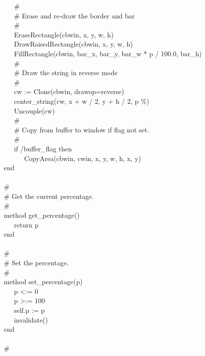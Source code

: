 {\>   \ \ \ \# \\
\>   \ \ \ \# Erase and re-draw the border and bar \\
\>   \ \ \ \# \\
\>   \ \ \ EraseRectangle(cbwin, x, y, w, h) \\
\>   \ \ \ DrawRaisedRectangle(cbwin, x, y, w,
h) \\
\>   \ \ \ FillRectangle(cbwin, bar\_x, bar\_y,
bar\_w * p / 100.0, bar\_h) \\
\>   \ \ \ \# \\
\>   \ \ \ \# Draw the string in reverse mode \\
\>   \ \ \ \# \\
\>   \ \ \ cw := Clone(cbwin,
{\textquotedbl}drawop=reverse{\textquotedbl}) \\
\>   \ \ \ center\_string(cw, x + w / 2, y + h / 2,
p {\textbar}{\textbar} {\textquotedbl}\%{\textquotedbl}) \\
\>   \ \ \ Uncouple(cw) \\
\>   \ \ \ \# \\
\>   \ \ \ \# Copy from buffer to window if flag not set. \\
\>   \ \ \ \# \\
\>   \ \ \ if /buffer\_flag then \\
\>   \ \ \ \ \ \ CopyArea(cbwin, cwin, x, y,
w, h, x, y) \\
\>   end \\
\ \\
\>   \# \\
\>   \# Get the current percentage. \\
\>   \# \\
\>   method get\_percentage() \\
\>   \ \ \ return p \\
\>   end \\
\ \\
\>   \# \\
\>   \# Set the percentage. \\
\>   \# \\
\>   method set\_percentage(p) \\
\>   \ \ \ p {\textless}:= 0 \\
\>   \ \ \ p {\textgreater}:= 100 \\
\>   \ \ \ self.p := p \\
\>   \ \ \ invalidate() \\
\>   end \\
\ \\
\>   \# \\
}
